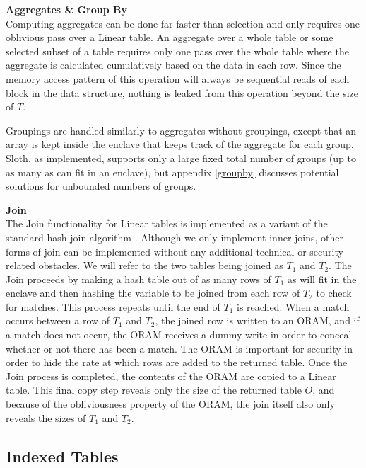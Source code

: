 \documentclass[USenglish,oneside,twocolumn]{article}
\def\name/{Sloth}
\begin{document}
\medskip \noindent \textbf{Aggregates \& Group By}\\
Computing aggregates can be done far faster than selection and only requires one oblivious pass over a Linear table. An aggregate over a whole table or some selected subset of a table requires only one pass over the whole table where the aggregate is calculated cumulatively based on the data in each row. Since the memory access pattern of this operation will always be sequential reads of each block in the data structure, nothing is leaked from this operation beyond the size of $T$. 

Groupings are handled similarly to aggregates without groupings, except that an array is kept inside the enclave that keeps track of the aggregate for each group. \name/, as implemented, supports only a large fixed total number of groups (up to as many as can fit in an enclave), but appendix \ref{groupby} discusses potential solutions for unbounded numbers of groups. 

\medskip \noindent \textbf{Join}\\
The Join functionality for Linear tables is implemented as a variant of the standard hash join algorithm \cite{EN10}. Although we only implement inner joins, other forms of join can be implemented without any additional technical or security-related obstacles. We will refer to the two tables being joined as $T_1$ and $T_2$. The Join proceeds by making a hash table out of as many rows of $T_1$ as will fit in the enclave and then hashing the variable to be joined from each row of $T_2$ to check for matches. This process repeats until the end of $T_1$ is reached. When a match occurs between a row of $T_1$ and $T_2$, the joined row is written to an ORAM, and if a match does not occur, the ORAM receives a dummy write in order to conceal whether or not there has been a match. The ORAM is important for security in order to hide the rate at which rows are added to the returned table. Once the Join process is completed, the contents of the ORAM are copied to a Linear table. This final copy step reveals only the size of the returned table $O$, and because of the obliviousness property of the ORAM, the join itself also only reveals the sizes of $T_1$ and $T_2$. 

\subsection{Indexed Tables}
\end{document}
